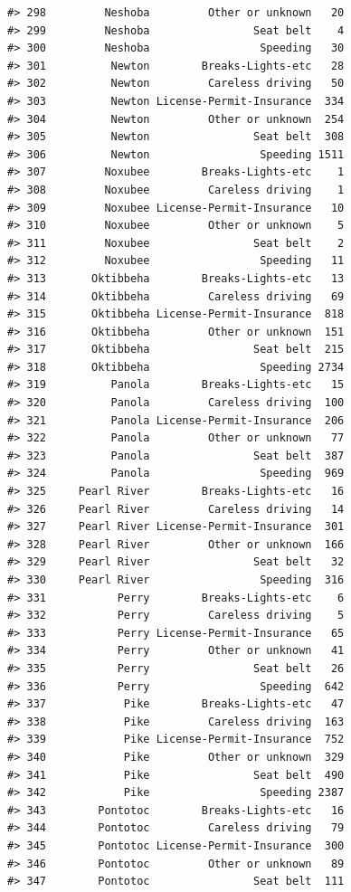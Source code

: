 \documentclass[
]{book}
\begin{document}
\begin{verbatim}
#> 298         Neshoba         Other or unknown   20
#> 299         Neshoba                Seat belt    4
#> 300         Neshoba                 Speeding   30
#> 301          Newton        Breaks-Lights-etc   28
#> 302          Newton         Careless driving   50
#> 303          Newton License-Permit-Insurance  334
#> 304          Newton         Other or unknown  254
#> 305          Newton                Seat belt  308
#> 306          Newton                 Speeding 1511
#> 307         Noxubee        Breaks-Lights-etc    1
#> 308         Noxubee         Careless driving    1
#> 309         Noxubee License-Permit-Insurance   10
#> 310         Noxubee         Other or unknown    5
#> 311         Noxubee                Seat belt    2
#> 312         Noxubee                 Speeding   11
#> 313       Oktibbeha        Breaks-Lights-etc   13
#> 314       Oktibbeha         Careless driving   69
#> 315       Oktibbeha License-Permit-Insurance  818
#> 316       Oktibbeha         Other or unknown  151
#> 317       Oktibbeha                Seat belt  215
#> 318       Oktibbeha                 Speeding 2734
#> 319          Panola        Breaks-Lights-etc   15
#> 320          Panola         Careless driving  100
#> 321          Panola License-Permit-Insurance  206
#> 322          Panola         Other or unknown   77
#> 323          Panola                Seat belt  387
#> 324          Panola                 Speeding  969
#> 325     Pearl River        Breaks-Lights-etc   16
#> 326     Pearl River         Careless driving   14
#> 327     Pearl River License-Permit-Insurance  301
#> 328     Pearl River         Other or unknown  166
#> 329     Pearl River                Seat belt   32
#> 330     Pearl River                 Speeding  316
#> 331           Perry        Breaks-Lights-etc    6
#> 332           Perry         Careless driving    5
#> 333           Perry License-Permit-Insurance   65
#> 334           Perry         Other or unknown   41
#> 335           Perry                Seat belt   26
#> 336           Perry                 Speeding  642
#> 337            Pike        Breaks-Lights-etc   47
#> 338            Pike         Careless driving  163
#> 339            Pike License-Permit-Insurance  752
#> 340            Pike         Other or unknown  329
#> 341            Pike                Seat belt  490
#> 342            Pike                 Speeding 2387
#> 343        Pontotoc        Breaks-Lights-etc   16
#> 344        Pontotoc         Careless driving   79
#> 345        Pontotoc License-Permit-Insurance  300
#> 346        Pontotoc         Other or unknown   89
#> 347        Pontotoc                Seat belt  111

\end{verbatim}
\end{document}
